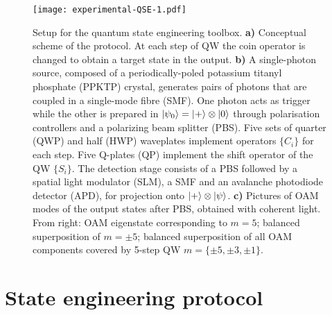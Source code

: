 \begin{figure}[t!]
\texttt{[image: experimental-QSE-1.pdf]}
\caption{Setup for the quantum state engineering toolbox. {\bf a)} Conceptual scheme of the protocol. At each step of \ac{QW} the coin operator is changed to obtain a target state in the output. {\bf b)} A single-photon source, composed of a periodically-poled potassium titanyl phosphate (PPKTP) crystal, generates pairs of photons that are coupled in a single-mode fibre (SMF). One photon acts as trigger while the other is prepared in $\ket{\psi_0}=\ket{+}\otimes 
\ket{0}$ through polarisation controllers and a polarizing beam splitter (PBS). Five sets of quarter (QWP) and half (HWP) waveplates implement operators $\{ C_i\}$ for each step. Five Q-plates (QP) implement the shift operator of the \ac{QW}
$\{S_i\}$. The detection stage consists of a PBS followed by a spatial light modulator (SLM), 
a SMF and an avalanche photodiode detector (APD), for projection onto $\ket{+} \otimes \ket{\psi}$. %
{\bf c)} Pictures of OAM modes of the output states after PBS, obtained with coherent light. From right: OAM eigenstate corresponding to $m=5$; balanced superposition of $m=\pm 5$; balanced superposition of all OAM components covered by 5-step \ac{QW} $m=\{\pm 5, \pm 3, \pm 1\}$. }
\label{app}
\end{figure}

\section{State engineering protocol}
\label{sec:expQWs:engineeringQWs}



